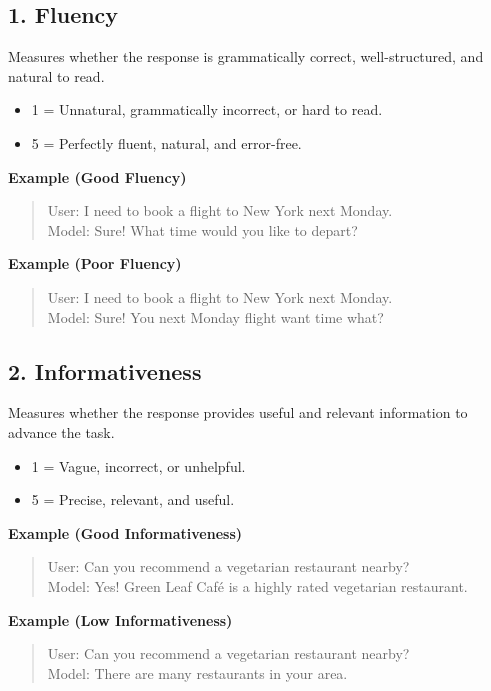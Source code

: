 \subsection*{1. Fluency}
Measures whether the response is grammatically correct, well-structured, and natural to read.

\begin{itemize}
    \item 1 = Unnatural, grammatically incorrect, or hard to read.
    \item 5 = Perfectly fluent, natural, and error-free.
\end{itemize}

\textbf{Example (Good Fluency)}
\begin{quote}
User: I need to book a flight to New York next Monday.\\
Model: Sure! What time would you like to depart?
\end{quote}

\textbf{Example (Poor Fluency)}
\begin{quote}
User: I need to book a flight to New York next Monday.\\
Model: Sure! You next Monday flight want time what?
\end{quote}

\subsection*{2. Informativeness}
Measures whether the response provides useful and relevant information to advance the task.

\begin{itemize}
    \item 1 = Vague, incorrect, or unhelpful.
    \item 5 = Precise, relevant, and useful.
\end{itemize}

\textbf{Example (Good Informativeness)}
\begin{quote}
User: Can you recommend a vegetarian restaurant nearby?\\
Model: Yes! Green Leaf Café is a highly rated vegetarian restaurant.
\end{quote}

\textbf{Example (Low Informativeness)}
\begin{quote}
User: Can you recommend a vegetarian restaurant nearby?\\
Model: There are many restaurants in your area.
\end{quote}

